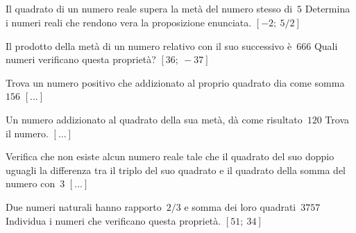 \begin{multicols}{2}


\subsection*{}

\begin{esercizio}[\Ast]
 \label{ese:3.112}
Il quadrato di un numero reale supera la metà del numero stesso di~\(5\)
Determina i numeri reali che rendono vera la proposizione enunciata.
\hfill\(\left[-2;~5/2\right]\)
\end{esercizio}

\begin{esercizio}[\Ast]
 \label{ese:3.113}
Il prodotto della metà di un numero relativo con il suo successivo è~\(666\)
Quali numeri verificano questa proprietà?
\hfill\(\left[36;~-37\right]\)
\end{esercizio}

\begin{esercizio}
 \label{ese:3.114}
Trova un numero positivo che addizionato al proprio quadrato dia come 
somma~\(156\)
\hfill\(\left[...\right]\)
\end{esercizio}

\begin{esercizio}
 \label{ese:3.115}
Un numero addizionato al quadrato della sua metà, dà come risultato~\(120\)
Trova il numero.
\hfill\(\left[...\right]\)
\end{esercizio}

\begin{esercizio}
 \label{ese:3.116}
Verifica che non esiste alcun numero reale tale che il quadrato del suo
doppio uguagli la differenza tra il triplo del suo quadrato e il quadrato
della somma del numero con~\(3\)
\hfill\(\left[...\right]\)
\end{esercizio}

\begin{esercizio}[\Ast]
 \label{ese:3.117}
Due numeri naturali hanno rapporto~\(2/3\) e somma dei loro 
quadrati~\(3757\)
Individua i numeri che verificano questa proprietà.
\hfill\(\left[51;~34\right]\)
\end{esercizio}


\end{multicols}
